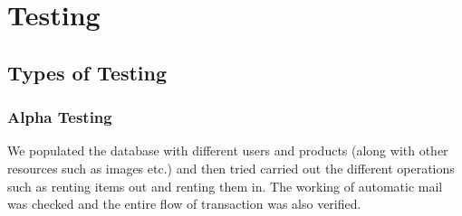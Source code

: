 \documentclass[11pt]{report}
\begin{document}
\section{Testing}

\subsection{Types of Testing}
\subsubsection{Alpha Testing}
We populated the database with different users and products (along with other resources such as images etc.) and then tried carried out the different operations such as renting items out and renting them in. The working of automatic mail was checked and the entire flow of transaction was also verified.
\end{document}

